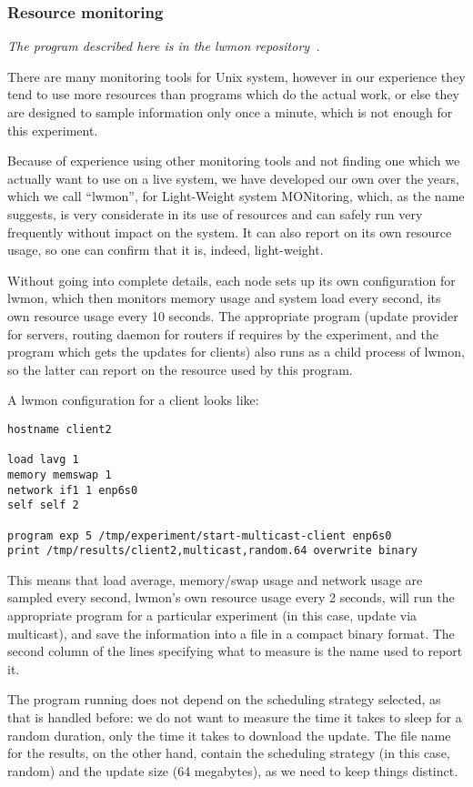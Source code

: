 \documentclass[a4paper,12pt]{article}
\begin{document}
\subsubsection{Resource monitoring}
{\em The program described here is in the lwmon repository~\cite{lwmon}.}

There are many monitoring tools for Unix system, however in our experience
they tend to use more resources than programs which do the actual work,
or else they are designed to sample information only once a minute,
which is not enough for this experiment.

Because of experience using other monitoring tools and not finding
one which we actually want to use on a live system, we have developed
our own over the years, which we call ``lwmon'', for Light-Weight
system MONitoring, which, as the name suggests, is very considerate
in its use of resources and can safely run very frequently without
impact on the system.  It can also report on its own resource usage,
so one can confirm that it is, indeed, light-weight.

Without going into complete details, each node sets up its own
configuration for lwmon, which then monitors memory usage and
system load every second, its own resource usage every 10
seconds.  The appropriate program (update provider for servers,
routing daemon for routers if requires by the experiment, and
the program which gets the updates for clients) also runs as
a child process of lwmon, so the latter can report on the resource
used by this program.

A lwmon configuration for a client looks like:

\begin{verbatim}
hostname client2

load lavg 1
memory memswap 1
network if1 1 enp6s0
self self 2

program exp 5 /tmp/experiment/start-multicast-client enp6s0
print /tmp/results/client2,multicast,random.64 overwrite binary
\end{verbatim}

This means that load average, memory/swap usage and network usage are
sampled every second, lwmon's own resource usage every 2 seconds, will
run the appropriate program for a particular experiment (in this case,
update via multicast), and save the information into a file in a compact
binary format. The second column of the lines specifying what to measure
is the name used to report it.

The program running does not depend on the scheduling strategy selected,
as that is handled before: we do not want to measure the time it takes
to sleep for a random duration, only the time it takes to download the
update.  The file name for the results, on the other hand, contain the
scheduling strategy (in this case, random) and the update size (64
megabytes), as we need to keep things distinct.
\end{document}
